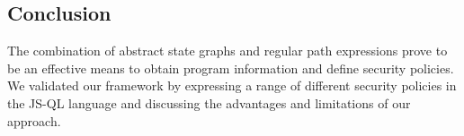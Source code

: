 \subsection{Conclusion}

The combination of abstract state graphs and regular path expressions prove to be an effective means to obtain program information and define security policies. We validated our framework by expressing a range of different security policies in the JS-QL language and discussing the advantages and limitations of our approach.
  


